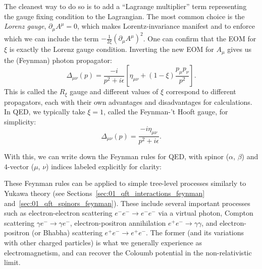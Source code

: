 The cleanest way to do so is to add a ``Lagrange multiplier'' term representing the gauge fixing condition to the Lagrangian.
The most common choice is the \textit{Lorenz gauge}, $\partial_\mu A^\mu = 0$, which makes Lorentz-invariance manifest and to enforce which we can include the term $-\frac{1}{2\xi}(\partial_\mu A^\mu)^2$.
One can confirm that the EOM for $\xi$ is exactly the Lorenz gauge condition.
Inverting the new EOM for $A_\mu$ gives us the (Feynman) photon propagator:
\begin{equation}
	\label{eq:01_qft_gt_maxwell_photon_propagator}
	\Delta_{\mu\nu}(p) = \frac{-i}{p^2 + i\epsilon}\left[ \eta_{\mu\nu} + (1-\xi)\frac{p_\mu p_\nu}{p^2} \right].
\end{equation}
This is called the $R_\xi$ gauge and different values of $\xi$ correspond to different propagators, each with their own advantages and disadvantages for calculations.
In QED, we typically take $\xi = 1$, called the Feynman-'t Hooft gauge, for simplicity:
\begin{equation}
	\label{eq:01_qft_gt_maxwell_photon_propagator_feynman}
	\Delta_{\mu\nu}(p) = \frac{-i \eta_{\mu\nu}}{p^2 + i\epsilon}.
\end{equation}

\begin{definition}
	\label{def:01_qft_gt_maxwell_feynman}
	With this, we can write down the Feynman rules for QED, with spinor ($\alpha$, $\beta$) and $4$-vector ($\mu$, $\nu$) indices labeled explicitly for clarity:
\end{definition}


These Feynman rules can be applied to simple tree-level processes similarly to Yukawa theory (see Sections~\ref{sec:01_qft_interactions_feynman} and~\ref{sec:01_qft_spinors_feynman}).
These include several important processes such as electron-electron scattering $e^-e^- \rightarrow e^-e^-$ via a virtual photon, Compton scattering $\gamma e^- \rightarrow \gamma e^-$, electron-positron annihilation $e^+e^- \rightarrow \gamma\gamma$, and electron-positron (or Bhabha) scattering $e^+e^- \rightarrow e^+e^-$.
The former (and its variations with other charged particles) is what we generally experience as electromagnetism, and can recover the Coloumb potential in the non-relativistic limit.


